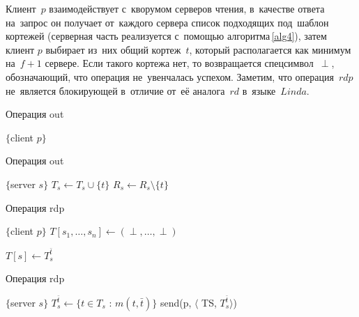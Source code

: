 Клиент~$p$ взаимодействует с~кворумом серверов чтения, в~качестве ответа на~запрос он получает от~каждого сервера список подходящих под~шаблон кортежей (серверная часть реализуется с~помощью алгоритма\,\ref{alg4}), затем клиент $p$ выбирает из~них общий кортеж~$t$, который располагается как минимум на~$f + 1$ сервере. Если такого кортежа нет, то возвращается спецсимвол~$\perp$, обозначающий, что операция не~увенчалась успехом. Заметим, что операция~$rdp$ не~является блокирующей в~отличие от~её аналога~$rd$ в~языке~$Linda$.

\begin{algorithm}[H]
	\caption{Операция out}\label{alg1}
	\begin{algorithmic}[1]
		\Statex $\{$client $p \}$
		\State {}
		\EndFor
		\EndProcedure
	\end{algorithmic}
\end{algorithm}

\begin{algorithm}[H]
	\caption{Операция out}\label{alg2}
	\begin{algorithmic}[1]
		\Statex $\{$server $s \}$
		\State $T_s \gets T_s \cup \{t\}$
		\EndIf
		\State $R_s \gets R_s \setminus \{t\}$
		\EndUpon
	\end{algorithmic}
\end{algorithm}

\begin{algorithm}[H]
	\caption{Операция rdp}\label{alg3}
	\begin{algorithmic}[1]
		\Statex $\{$client $p \}$
		\State $T[s_1, \dots, s_n] \gets (\perp, \dots, \perp)$
		
		\State {}
		\EndFor
		
		\Repeat
		\State {}
		\State $T[s] \gets T_s^{\bar t}$
		
		\State {}
		\EndIf
		\State \Return{$\perp$}
		\EndFunction
	\end{algorithmic}
\end{algorithm}

\begin{algorithm}[H]
	\caption{Операция rdp}\label{alg4}
	\begin{algorithmic}[1]
		\Statex $\{$server $s \}$
		\State $T_s^{\bar t} \gets \{t \in T_s$ : $m(t, \bar t)\}$
		\State send(p, $\langle$ TS, $T_s^{\bar t}\rangle$)
		\EndUpon
	\end{algorithmic}
\end{algorithm}

